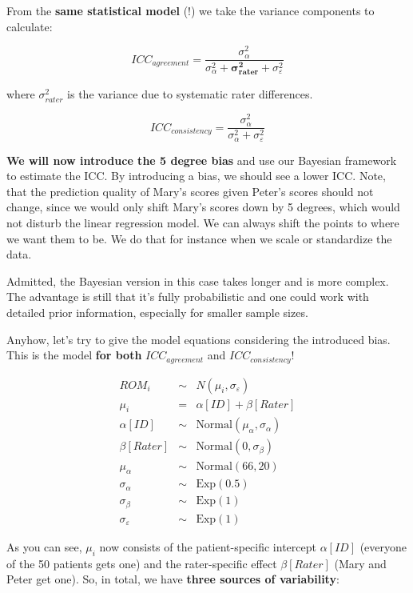 \documentclass[
]{book}
\begin{document}
From the \textbf{same statistical model} (!) we take the variance components to calculate:

\[ICC_{agreement} = \frac{\sigma_{\alpha}^2}{\sigma_{\alpha}^2 + \mathbf{\sigma_{rater}^2} + \sigma_{\varepsilon}^2}\]

where \(\sigma_{rater}^2\) is the variance due to systematic rater differences.

\[ICC_{consistency} = \frac{\sigma_{\alpha}^2}{\sigma_{\alpha}^2 + \sigma_{\varepsilon}^2}\]

\textbf{We will now introduce the 5 degree bias} and use our Bayesian
framework to estimate the ICC.
By introducing a bias, we should see
a lower ICC. Note, that the prediction quality of Mary's scores
given Peter's scores should not change, since we would only shift Mary's scores
down by 5 degrees, which would not disturb the linear regression model. We can
always shift the points to where we want them to be. We do that for instance
when we scale or standardize the data.

Admitted, the Bayesian version in this case takes longer and is more complex.
The advantage is still that it's fully probabilistic and one could work with
detailed prior information, especially for smaller sample sizes.

Anyhow, let's try to give the model equations considering
the introduced bias. This is the model \textbf{for both}
\(ICC_{agreement}\) and \(ICC_{consistency}\)!

\[
\begin{array}{rcl}
ROM_i &\sim& N(\mu_i, \sigma_{\varepsilon}) \\
\mu_i &=& \alpha[ID] + \beta[Rater] \\
\alpha[ID] &\sim& \text{Normal}(\mu_{\alpha}, \sigma_{\alpha}) \\
\beta[Rater] &\sim& \text{Normal}(0, \sigma_{\beta}) \\
\mu_{\alpha} &\sim& \text{Normal}(66, 20) \\
\sigma_{\alpha} &\sim& \text{Exp}(0.5) \\
\sigma_{\beta} &\sim& \text{Exp}(1) \\
\sigma_{\varepsilon} &\sim& \text{Exp}(1)
\end{array}
\]

As you can see, \(\mu_i\) now consists of the patient-specific intercept \(\alpha[ID]\)
(everyone of the 50 patients gets one)
and the rater-specific effect \(\beta[Rater]\) (Mary and Peter get one).
So, in total, we have \textbf{three sources of variability}:
\end{document}

